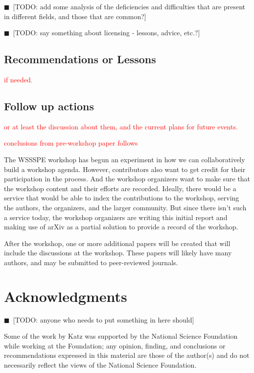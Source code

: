\documentclass[11pt, oneside]{amsart}
\newcommand{\todo}[1]{{\color{blue}$\blacksquare$~\textsf{[TODO: #1]}}}
\newcommand{\note}[1]{ {\textcolor{red}    { #1 }}}
\begin{document}
\todo{add some analysis of the deficiencies and difficulties that are
  present in different fields, and those that are common?}

\todo{say something about licensing - lessons, advice, etc.?}

\subsection{Recommendations or Lessons}

\note{if needed.}

\subsection{Follow up actions}

\note{or at least the discussion about them, and the current plans for
  future events.}

\note{conclusions from pre-workshop paper follows}

The WSSSPE workshop has begun an experiment in how we can
collaboratively build a workshop agenda. However, contributors also
want to get credit for their participation in the process. And the
workshop organizers want to make sure that the workshop content and
their efforts are recorded.  Ideally, there would be a service that
would be able to index the contributions to the workshop, serving the
authors, the organizers, and the larger community. But since there
isn't such a service today, the workshop organizers are writing this
initial report and making use of arXiv as a partial solution to
provide a record of the workshop.

After the workshop, one or more additional papers will be created that
will include the discussions at the workshop. These papers will likely
have many authors, and may be submitted to peer-reviewed journals.


\section*{Acknowledgments}

\todo{anyone who needs to put something in here should}

Some of the work by Katz was
supported by the National Science Foundation while working at the
Foundation; any opinion, finding, and conclusions or recommendations
expressed in this material are those of the author(s) and do not
necessarily reflect the views of the National Science Foundation.
\end{document}
